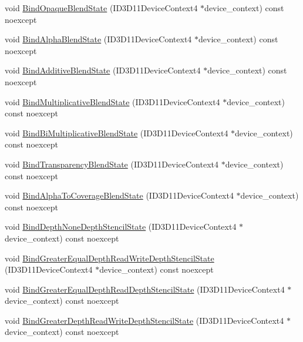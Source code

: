 \begin{DoxyCompactItemize}
\item 
void \hyperlink{classmage_1_1_rendering_state_manager_aa69d0694e8ebda3ba165a86bd1e61930}{Bind\+Opaque\+Blend\+State} (I\+D3\+D11\+Device\+Context4 $\ast$device\+\_\+context) const noexcept
\item 
void \hyperlink{classmage_1_1_rendering_state_manager_aa8515490c3aa764cfb8bb9a1121ced03}{Bind\+Alpha\+Blend\+State} (I\+D3\+D11\+Device\+Context4 $\ast$device\+\_\+context) const noexcept
\item 
void \hyperlink{classmage_1_1_rendering_state_manager_a0ae04882682ccccd4e75830bd2b4159b}{Bind\+Additive\+Blend\+State} (I\+D3\+D11\+Device\+Context4 $\ast$device\+\_\+context) const noexcept
\item 
void \hyperlink{classmage_1_1_rendering_state_manager_aaeeba94b7318056208af5a3b8ef40c44}{Bind\+Multiplicative\+Blend\+State} (I\+D3\+D11\+Device\+Context4 $\ast$device\+\_\+context) const noexcept
\item 
void \hyperlink{classmage_1_1_rendering_state_manager_a91f9414dde728ddf889fc39ac14e0bc4}{Bind\+Bi\+Multiplicative\+Blend\+State} (I\+D3\+D11\+Device\+Context4 $\ast$device\+\_\+context) const noexcept
\item 
void \hyperlink{classmage_1_1_rendering_state_manager_adfbbfa46b7ddad2083f03eafea13bc1c}{Bind\+Transparency\+Blend\+State} (I\+D3\+D11\+Device\+Context4 $\ast$device\+\_\+context) const noexcept
\item 
void \hyperlink{classmage_1_1_rendering_state_manager_a358729c6b5f9aac89b95842bd095ec93}{Bind\+Alpha\+To\+Coverage\+Blend\+State} (I\+D3\+D11\+Device\+Context4 $\ast$device\+\_\+context) const noexcept
\item 
void \hyperlink{classmage_1_1_rendering_state_manager_ab3006eac54bc9027975529484e897d33}{Bind\+Depth\+None\+Depth\+Stencil\+State} (I\+D3\+D11\+Device\+Context4 $\ast$device\+\_\+context) const noexcept
\item 
void \hyperlink{classmage_1_1_rendering_state_manager_acaff9c2ced6147953c9f66a859238dc1}{Bind\+Greater\+Equal\+Depth\+Read\+Write\+Depth\+Stencil\+State} (I\+D3\+D11\+Device\+Context4 $\ast$device\+\_\+context) const noexcept
\item 
void \hyperlink{classmage_1_1_rendering_state_manager_a746c39e78dc0ede638624f513e4bb380}{Bind\+Greater\+Equal\+Depth\+Read\+Depth\+Stencil\+State} (I\+D3\+D11\+Device\+Context4 $\ast$device\+\_\+context) const noexcept
\item 
void \hyperlink{classmage_1_1_rendering_state_manager_aecae68a287ff478e7dcd75293c3e28cf}{Bind\+Greater\+Depth\+Read\+Write\+Depth\+Stencil\+State} (I\+D3\+D11\+Device\+Context4 $\ast$device\+\_\+context) const noexcept

\end{DoxyCompactItemize}
